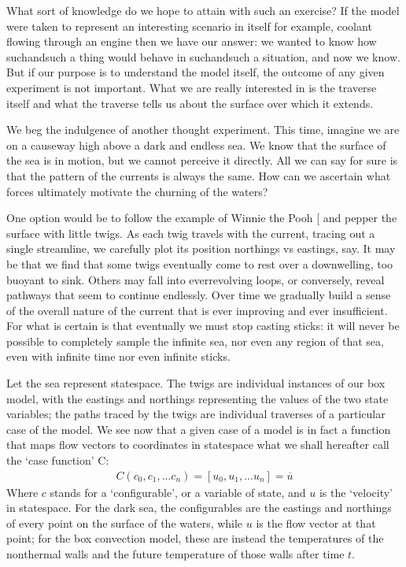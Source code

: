 \documentclass[letterpaper,10pt,english]{jupyterBook}
\begin{document}
\sphinxAtStartPar
What sort of knowledge do we hope to attain with such an exercise? If the model were taken to represent an interesting scenario in itself \sphinxhyphen{} for example, coolant flowing through an engine \sphinxhyphen{} then we have our answer: we wanted to know how such\sphinxhyphen{}and\sphinxhyphen{}such a thing would behave in such\sphinxhyphen{}and\sphinxhyphen{}such a situation, and now we know. But if our purpose is to understand the model itself, the outcome of any given experiment is not important. What we are really interested in is the traverse itself \sphinxhyphen{} and what the traverse tells us about the surface over which it extends.

\sphinxAtStartPar
We beg the indulgence of another thought experiment. This time, imagine we are on a causeway high above a dark and endless sea. We know that the surface of the sea is in motion, but we cannot perceive it directly. All we can say for sure is that the pattern of the currents is always the same. How can we ascertain what forces ultimately motivate the churning of the waters?

\sphinxAtStartPar
One option would be to follow the example of Winnie the Pooh {[}\sphinxcite{references:id56}{]} and pepper the surface with little twigs. As each twig travels with the current, tracing out a single streamline, we carefully plot its position \sphinxhyphen{} northings vs eastings, say. It may be that we find that some twigs eventually come to rest over a downwelling, too buoyant to sink. Others may fall into ever\sphinxhyphen{}revolving loops, or conversely, reveal pathways that seem to continue endlessly. Over time we gradually build a sense of the overall nature of the current that is ever improving \sphinxhyphen{} and ever insufficient. For what is certain is that eventually we must stop casting sticks: it will never be possible to completely sample the infinite sea, nor even any region of that sea, even with infinite time \sphinxhyphen{} nor even infinite sticks.

\sphinxAtStartPar
Let the sea represent state\sphinxhyphen{}space. The twigs are individual instances of our box model, with the eastings and northings representing the values of the two state variables; the paths traced by the twigs are individual traverses of a particular case of the model. We see now that a given case of a model is in fact a function that maps flow vectors to coordinates in state\sphinxhyphen{}space \sphinxhyphen{} what we shall hereafter call the ‘case function’ C:
\begin{equation*}
\begin{split} C \left( c_0, c_1, ... c_n \right) = \left[ u_0, u_1, ... u_n \right] = \overline{u} \end{split}
\end{equation*}
\sphinxAtStartPar
Where \(c\) stands for a ‘configurable’, or a variable of state, and \(u\) is the ‘velocity’ in state\sphinxhyphen{}space. For the dark sea, the configurables are the eastings and northings of every point on the surface of the waters, while \(u\) is the flow vector at that point; for the box convection model, these are instead the temperatures of the non\sphinxhyphen{}thermal walls and the future temperature of those walls after time \(t\).
\end{document}
